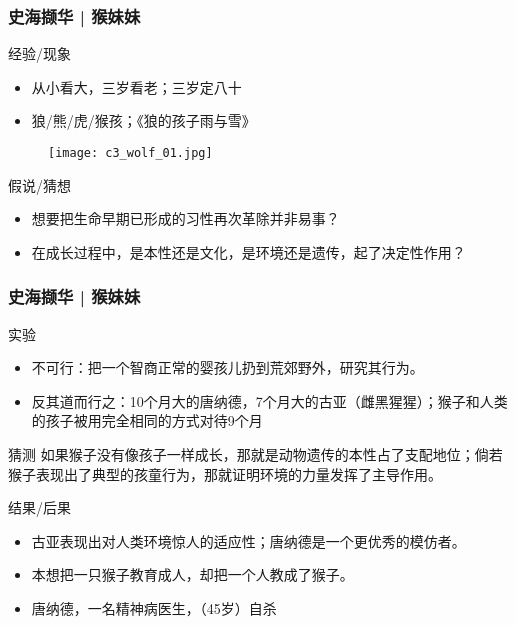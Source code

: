 \begin{frame}
  \frametitle{史海撷华 | 猴妹妹}
  \begin{block}{经验/现象}
    \begin{itemize}
      \item 从小看大，三岁看老；三岁定八十
      \item 狼/熊/虎/猴孩；《狼的孩子雨与雪》
    \end{itemize}
    \vspace{-1.5em}
    \begin{figure}
      \centering
      \texttt{[image: c3\_wolf\_01.jpg]}
    \end{figure}
  \end{block}
  \pause
  \begin{block}{假说/猜想}
    \begin{itemize}
      \item 想要把生命早期已形成的习性再次革除并非易事？
      \item 在成长过程中，是本性还是文化，是环境还是遗传，起了决定性作用？
    \end{itemize}
  \end{block}
\end{frame}

\begin{frame}
  \frametitle{史海撷华 | 猴妹妹}
  \begin{block}{实验}
    \begin{itemize}
      \item 不可行：把一个智商正常的婴孩儿扔到荒郊野外，研究其行为。
      \item 反其道而行之：10个月大的唐纳德，7个月大的古亚（雌黑猩猩）；猴子和人类的孩子被用完全相同的方式对待9个月
    \end{itemize}
  \end{block}
  \vspace{-0.5em}
  \pause
  \begin{block}{猜测}
    如果猴子没有像孩子一样成长，那就是动物遗传的本性占了支配地位；倘若猴子表现出了典型的孩童行为，那就证明环境的力量发挥了主导作用。
  \end{block}
  \vspace{-0.5em}
  \pause
  \begin{block}{结果/后果}
    \begin{itemize}
      \item 古亚表现出对人类环境惊人的适应性；唐纳德是一个更优秀的模仿者。
      \item 本想把一只猴子教育成人，却把一个人教成了猴子。
      \item 唐纳德，一名精神病医生，（45岁）自杀
    \end{itemize}
  \end{block}
\end{frame}

